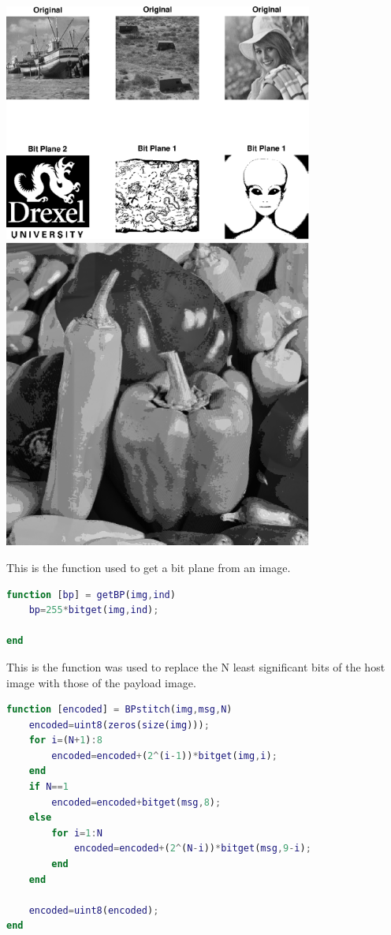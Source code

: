 \documentclass{article}
\begin{document}
\includegraphics [width=4in]{lab3_03.eps}
\includegraphics [width=4in]{lab3_04.eps}

This is the function used to get a bit plane from an image. 

\begin{lstlisting}[language=Matlab]
function [bp] = getBP(img,ind)
    bp=255*bitget(img,ind);

end
\end{lstlisting}

This is the function was used to replace the N least significant bits
of the host image with those of the payload image.

\begin{lstlisting}[language=Matlab]
function [encoded] = BPstitch(img,msg,N)
    encoded=uint8(zeros(size(img)));
    for i=(N+1):8
        encoded=encoded+(2^(i-1))*bitget(img,i);
    end
    if N==1
        encoded=encoded+bitget(msg,8);
    else
        for i=1:N
            encoded=encoded+(2^(N-i))*bitget(msg,9-i);
        end
    end

    encoded=uint8(encoded);
end
\end{lstlisting}
\end{document}
